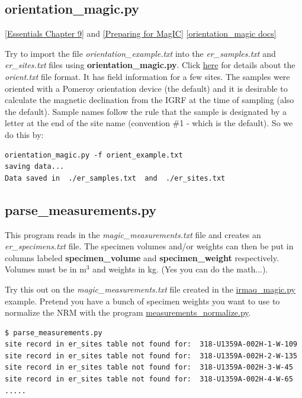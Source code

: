 \documentclass[11pt]{book}
\begin{document}
{{ \subsection{orientation\_magic.py}
 \href{http://earthref.org/MAGIC/books/Tauxe/Essentials/WebBook3ch9.html#ch9}{[Essentials Chapter 9]} and \href{#field_info}{[Preparing for MagIC]}
 \href{https://github.com/PmagPy/PmagPy/blob/master/programs/orientation_magic.py}{[orientation\_magic docs]}


  Try to import the file {\it orientation\_example.txt} into the {\it er\_samples.txt} and {\it er\_sites.txt} files using {\bf orientation\_magic.py}.  Click \href{#field_info}{here}  for details about the {\it orient.txt} file format.  It has field information for a few sites.  The samples were oriented with a Pomeroy orientation device  (the default) and it is desirable to calculate the magnetic declination from the IGRF at the time of sampling (also the default).  Sample names follow the rule that the sample is designated by a letter at the end of the site name (convention \#1 - which is the default).  So we do this by:

  \begin{verbatim}
orientation_magic.py -f orient_example.txt
saving data...
Data saved in  ./er_samples.txt  and  ./er_sites.txt

\end{verbatim}

%

\subsection{parse\_measurements.py}

This program reads in the {\it magic\_measurements.txt} file and creates an {\it er\_specimens.txt} file.   The specimen volumes and/or weights can then be put in columns labeled {\bf specimen\_volume} and {\bf specimen\_weight} respectively.  Volumes must be in m$^3$ and weights in kg.  (Yes you can do the math...).

Try this out on the {\it magic\_measurements.txt} file created in the \href{#irmaq_magic.py}{irmaq\_magic.py} example.  Pretend you have a bunch of specimen weights you want to use to normalize the NRM with the program \href{#measurements_normalize.py}{measurements\_normalize.py}.

\begin{verbatim}
$ parse_measurements.py
site record in er_sites table not found for:  318-U1359A-002H-1-W-109
site record in er_sites table not found for:  318-U1359A-002H-2-W-135
site record in er_sites table not found for:  318-U1359A-002H-3-W-45
site record in er_sites table not found for:  318-U1359A-002H-4-W-65
.....
\end{verbatim}

}}
\end{document}
